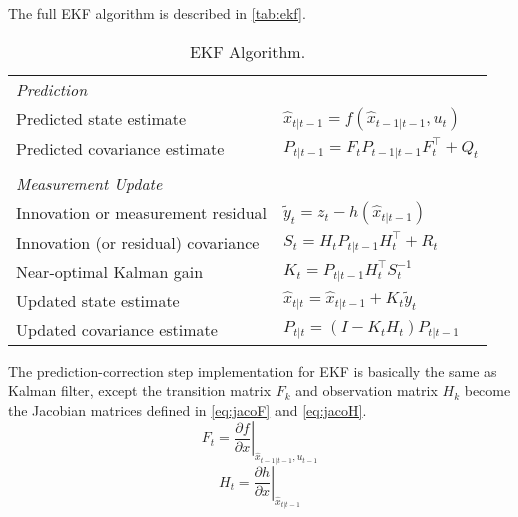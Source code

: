 The full \gls{EKF} algorithm is described in \autoref{tab:ekf}.
\begin{table}[h]
\begin{adjustbox}{max width=\textwidth}
  \centering
  \begin{tabular}{ll}
 \textit{Prediction} & \\
Predicted state estimate & $\hat{x}_{t|t-1} = f(\hat{x}_{t-1|t-1}, u_{t})$ \\
Predicted covariance estimate & $P_{t|t-1} =  {{F_{t}}} P_{t-1|t-1}{ {F_{t}^\top}} + Q_{t}$ \\
&\\
\textit{Measurement Update} & \\
Innovation or measurement residual & $\tilde{y}_{t} = z_{t} - h(\hat{x}_{t|t-1})$ \\
Innovation (or residual) covariance & $S_{t} = {{H_{t}}}P_{t|t-1}{{H_{t}^\top}} + R_{t}$ \\
Near-optimal Kalman gain & $K_{t} = P_{t|t-1}{{H_{t}^\top}}S_{t}^{-1}$ \\
Updated state estimate & $\hat{x}_{t|t} = \hat{x}_{t|t-1} + K_{t}\tilde{y}_{t}$ \\
Updated covariance estimate & $P_{t|t} = (I - K_{t} {{H_{t}}}) P_{t|t-1}$ \\
   
  \end{tabular}
  \end{adjustbox}
  \caption[Extended Kalman Filter Algorithm.]{\gls{EKF} Algorithm.}
  \label{tab:ekf}
\end{table}

The prediction-correction step implementation for \gls{EKF} is basically the same as Kalman filter, except the transition matrix $F_{k}$ and observation matrix $H_{k}$ become the Jacobian matrices defined in \autoref{eq:jacoF} and \autoref{eq:jacoH}. \\
\begin{equation}
\label{eq:jacoF}
{{F_{t}}} = \left . \frac{\partial f}{\partial x } \right \vert _{\hat{x}_{t-1|t-1},u_{t-1}}
\end{equation}
\begin{equation}
\label{eq:jacoH}
{{H_{t}}} = \left . \frac{\partial h}{\partial x } \right \vert _{\hat{x}_{t|t-1}}
\end{equation}


